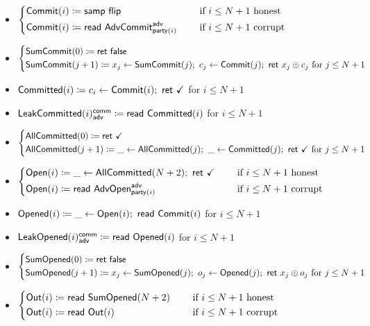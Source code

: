 \begin{itemize}
\item {\color{blue} $\begin{cases*} \Commit(i) \coloneqq \samp{\flip} & \hspace{10pt} \text{if $i \leq N+1$ honest} \\ \Commit(i) \coloneqq \read{\AdvCommit^\adv_{\party(i)}} & \hspace{10pt} \text{if $i \leq N+1$ corrupt} \end{cases*}$}
\item {\color{blue} $\begin{cases*} \SumCommit(0) \coloneqq \ret{\false} \\ \SumCommit(j+1) \coloneqq x_j \leftarrow \SumCommit(j); \ c_j \leftarrow \Commit(j); \ \ret{x_j \oplus c_j} \text{ for $j \leq N+1$} \end{cases*}$}
\item {\color{magenta} $\mathsf{Committed}(i) \coloneqq c_i \leftarrow \mathsf{Commit}(i); \ \mathsf{ret} \ \checkmark$ for $i \leq N+1$}
\item {\color{magenta} $\mathsf{LeakCommitted}(i)^{\mathsf{comm}}_{\mathsf{adv}} \coloneqq \mathsf{read} \ \mathsf{Committed}(i)$ for $i \leq N+1$}
\item {\color{magenta} $\begin{cases*} \AllCommitted(0) \coloneqq \ret{\checkmark} \\ \AllCommitted(j+1) \coloneqq \_ \leftarrow \AllCommitted(j); \ \_ \leftarrow \Committed(j); \ \ret{\checkmark} \text{ for $j \leq N+1$} \end{cases*}$}
\item {\color{teal} $\begin{cases*} \Open(i) \coloneqq \_ \leftarrow \AllCommitted(N+2); \ \ret{\checkmark} & \hspace{10pt} \text{if $i \leq N+1$ honest} \\ \Open(i) \coloneqq \read{\AdvOpen^\adv_{\party(i)}} & \hspace{10pt} \text{if $i \leq N+1$ corrupt} \end{cases*}$}
\item {\color{red} $\mathsf{Opened}(i) \coloneqq \_ \leftarrow \mathsf{Open}(i); \ \mathsf{read} \ \mathsf{Commit}(i)$ for $i \leq N+1$}
\item {\color{red} $\mathsf{LeakOpened}(i)^{\mathsf{comm}}_{\mathsf{adv}} \coloneqq \mathsf{read} \ \mathsf{Opened}(i)$ for $i \leq N+1$}
\item {\color{red} $\begin{cases*} \SumOpened(0) \coloneqq \ret{\false} \\ \SumOpened(j+1) \coloneqq x_j \leftarrow \SumOpened(j); \ o_j \leftarrow \Opened(j); \ \ret{x_j \oplus o_j} \text{ for $j \leq N+1$} \end{cases*}$}
\item $\begin{cases*} \Out(i) \coloneqq \read{\SumOpened(N+2)} & \hspace{10pt} \text{if $i \leq N+1$ honest} \\ \Out(i) \coloneqq \read{\Out(i)} & \hspace{10pt} \text{if $i \leq N+1$ corrupt} \end{cases*}$
\end{itemize}

